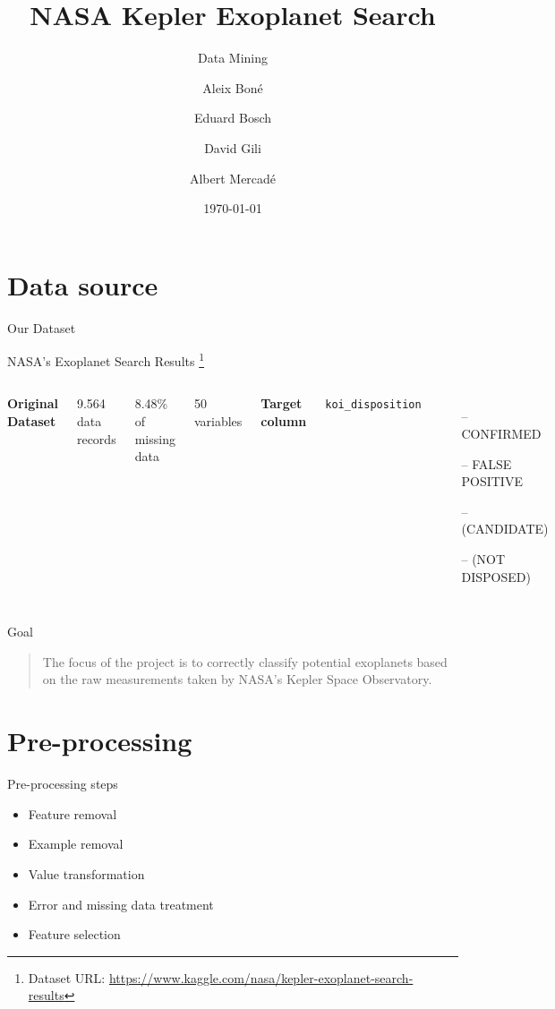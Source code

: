\documentclass[aspectratio=169]{beamer}
\title{NASA Kepler Exoplanet Search}
\subtitle{Data Mining}
\date{\today}
\author{
Aleix Boné \and
Eduard Bosch \and
David Gili \and
Albert Mercadé
}
\institute{UPC}
\begin{document}
  \maketitle

\section{Data source}
\begin{frame}{Our Dataset}
\begin{center}
    NASA's Exoplanet Search Results \footnote[frame]{Dataset URL: \url{https://www.kaggle.com/nasa/kepler-exoplanet-search-results}}
\vspace{5 mm}

\begin{columns}[t]

    \large
    \textbf{Original Dataset}

    \small

    9.564 data records

    8.48\% of missing data

    50 variables

    \large
    \textbf{Target column}

    \footnotesize
    \texttt{koi\_disposition}

    \begin{itemize}
        \itemsep0.05em
        \item[--] CONFIRMED
        \item[--] FALSE POSITIVE
        \item[--] (CANDIDATE)
        \item[--] (NOT DISPOSED)
    \end{itemize}

\end{columns}

\end{center}
\end{frame}


\begin{frame}{Goal}
\begin{quote}
The focus of the project is to correctly classify potential exoplanets based
on the raw measurements taken by NASA's Kepler Space Observatory.
\end{quote}
\end{frame}

\section{Pre-processing}
\begin{frame}{Pre-processing steps}
\large
\begin{itemize}
     \itemsep0.5em
     \item Feature removal
     \item Example removal
     \item Value transformation
     \item Error and missing data treatment
     \item Feature selection
\end{itemize}
\normalsize
\end{frame}
\end{document}
